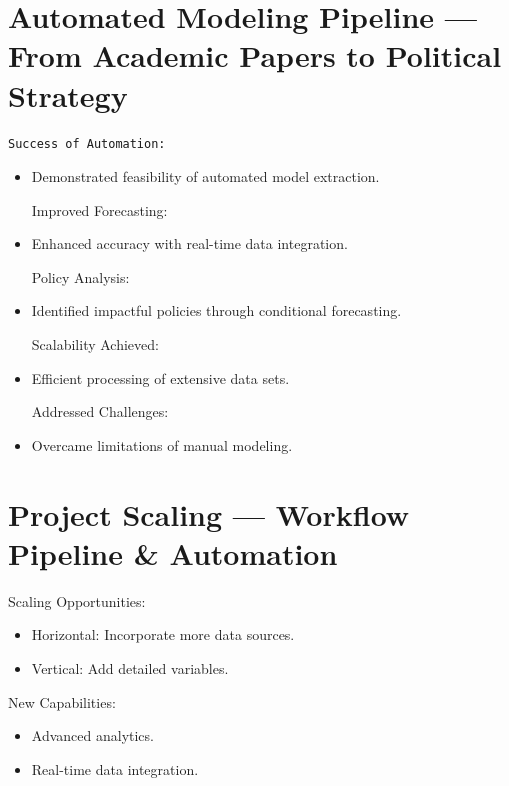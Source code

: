 \documentclass[
  letterpaper,
]{book}
\providecommand{\tightlist}{%
  \setlength{\itemsep}{0pt}\setlength{\parskip}{0pt}}
\begin{document}
\section{Automated Modeling Pipeline --- From Academic Papers to
Political
Strategy}\label{automated-modeling-pipeline-from-academic-papers-to-political-strategy}

\begin{verbatim}
Success of Automation:
\end{verbatim}

\begin{itemize}
\item
  Demonstrated feasibility of automated model extraction.

  Improved Forecasting:
\item
  Enhanced accuracy with real-time data integration.

  Policy Analysis:
\item
  Identified impactful policies through conditional forecasting.

  Scalability Achieved:
\item
  Efficient processing of extensive data sets.

  Addressed Challenges:
\item
  Overcame limitations of manual modeling.
\end{itemize}

\section{Project Scaling --- Workflow Pipeline \&
Automation}\label{project-scaling-workflow-pipeline-automation}

Scaling Opportunities:

\begin{itemize}
\tightlist
\item
  Horizontal: Incorporate more data sources.\\
\item
  Vertical: Add detailed variables.
\end{itemize}

New Capabilities:

\begin{itemize}
\tightlist
\item
  Advanced analytics.\\
\item
  Real-time data integration.
\end{itemize}
\end{document}
